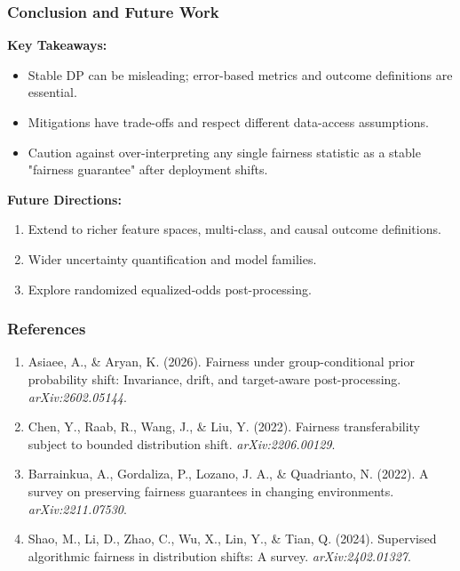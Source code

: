 \documentclass{beamer}
\begin{document}
\begin{frame}
\frametitle{Conclusion and Future Work}

\textbf{Key Takeaways:}

\begin{itemize}
    \item Stable DP can be misleading; error-based metrics and outcome definitions are essential.
    \item Mitigations have trade-offs and respect different data-access assumptions.
    \item \alert{Caution against over-interpreting any single fairness statistic as a stable "fairness guarantee"} after deployment shifts.
\end{itemize}

\vspace{0.5cm}

\textbf{Future Directions:}
\small
\begin{enumerate}
    \item Extend to richer feature spaces, multi-class, and causal outcome definitions.
    \item Wider uncertainty quantification and model families.
    \item Explore randomized equalized-odds post-processing.
\end{enumerate}

\end{frame}


\begin{frame}
\frametitle{References}

\small
\begin{enumerate}
    \item Asiaee, A., \& Aryan, K. (2026). Fairness under group-conditional prior probability shift: Invariance, drift, and target-aware post-processing. \textit{arXiv:2602.05144}.
    \item Chen, Y., Raab, R., Wang, J., \& Liu, Y. (2022). Fairness transferability subject to bounded distribution shift. \textit{arXiv:2206.00129}.
    \item Barrainkua, A., Gordaliza, P., Lozano, J. A., \& Quadrianto, N. (2022). A survey on preserving fairness guarantees in changing environments. \textit{arXiv:2211.07530}.
    \item Shao, M., Li, D., Zhao, C., Wu, X., Lin, Y., \& Tian, Q. (2024). Supervised algorithmic fairness in distribution shifts: A survey. \textit{arXiv:2402.01327}.
\end{enumerate}
\end{frame}
\end{document}
